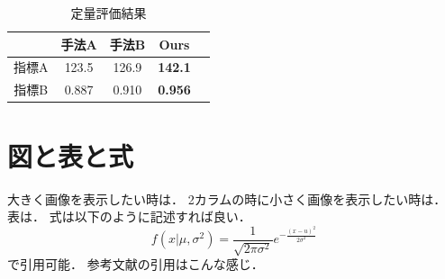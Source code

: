 \begin{table}[t]
    \centering
\caption{定量評価結果}
\label{tab:quantitative_eval}
\begin{tabular}{ccccc}
    \toprule
& 手法A & 手法B & Ours \\
    \midrule
指標A & 123.5 & 126.9 & {\bf 142.1} \\
指標B & 0.887 & 0.910 & {\bf 0.956} \\
\bottomrule
\end{tabular}
\end{table}

\section{図と表と式}
大きく画像を表示したい時は．
2カラムの時に小さく画像を表示したい時は．
表は．
式は以下のように記述すれば良い．
%
\begin{equation}
\label{eq:gauss}
f(x | \mu, \sigma^2) = \frac{1}{\sqrt{2 \pi \sigma^2}} e^{-\frac{(x - u)^2}{2 \sigma^2}}
\end{equation}
で引用可能．
%
参考文献の引用はこんな感じ\cite{goodfellow2014generative}．